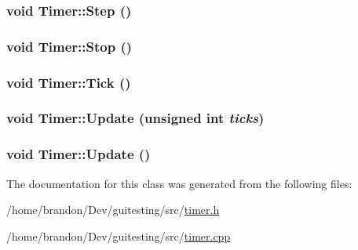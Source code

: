 \hypertarget{class_timer_a48af006144f41f1c7641cf05fca70d1}{
\subsubsection[{Step}]{\setlength{\rightskip}{0pt plus 5cm}void Timer::Step ()}}
\label{class_timer_a48af006144f41f1c7641cf05fca70d1}


\hypertarget{class_timer_6379e797f968aaee6ac3bb12dc6b81c5}{
\subsubsection[{Stop}]{\setlength{\rightskip}{0pt plus 5cm}void Timer::Stop ()}}
\label{class_timer_6379e797f968aaee6ac3bb12dc6b81c5}


\hypertarget{class_timer_f90455f3201a327ae96eb37e21a9ca31}{
\subsubsection[{Tick}]{\setlength{\rightskip}{0pt plus 5cm}void Timer::Tick ()}}
\label{class_timer_f90455f3201a327ae96eb37e21a9ca31}


\hypertarget{class_timer_3d479c440805436b4b61704e33b0484b}{
\subsubsection[{Update}]{\setlength{\rightskip}{0pt plus 5cm}void Timer::Update (unsigned int {\em ticks})}}
\label{class_timer_3d479c440805436b4b61704e33b0484b}


\hypertarget{class_timer_77a6595649759e7236d1b43c2c10e16b}{
\subsubsection[{Update}]{\setlength{\rightskip}{0pt plus 5cm}void Timer::Update ()}}
\label{class_timer_77a6595649759e7236d1b43c2c10e16b}




The documentation for this class was generated from the following files:\begin{CompactItemize}
\item 
/home/brandon/Dev/guitesting/src/\hyperlink{timer_8h}{timer.h}\item 
/home/brandon/Dev/guitesting/src/\hyperlink{timer_8cpp}{timer.cpp}\end{CompactItemize}
